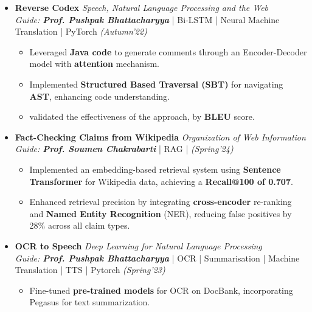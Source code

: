 \documentclass[a4paper,10.5pt]{article}
\begin{document}
\begin{itemize}[noitemsep,nolistsep]

\item \textbf{Reverse Codex} \hfill {\emph{Speech, Natural Language Processing and the Web}}\\
\emph{Guide: \textbf{Prof. Pushpak Bhattacharyya}} | Bi-LSTM | Neural Machine Translation | PyTorch\hfill
\emph{(Autumn'22)}
\vspace{0.1cm}
\begin{itemize}[noitemsep,nolistsep]
    \item Leveraged \textbf{Java code} to generate comments through an Encoder-Decoder model with \textbf{attention} mechanism.
    
    \item Implemented \textbf{Structured Based Traversal (SBT)} for navigating \textbf{AST}, enhancing code understanding.
    \vspace{0.07cm}
    
    \item validated the effectiveness of the approach, by \textbf{BLEU} score.
\end{itemize}
\vspace{0.15cm}

\item \textbf{Fact-Checking Claims from Wikipedia}  \hfill {\emph{Organization of Web Information}}\\
\emph{Guide: \textbf{Prof. Soumen Chakrabarti}} | RAG |  \hfill
\emph{(Spring'24)}
\vspace{0.1cm}
\begin{itemize}[noitemsep,nolistsep]
    \item Implemented an embedding-based retrieval system using \textbf{Sentence Transformer} for Wikipedia data, achieving a \textbf{Recall@100 of 0.707}.
    \vspace{0.07cm}
    \item Enhanced retrieval precision by integrating \textbf{cross-encoder} re-ranking and \textbf{Named Entity Recognition} (NER), reducing false positives by 28\% across all claim types.
\end{itemize}
\vspace{0.15cm}

\item \textbf{OCR to Speech} \hfill {\emph{Deep Learning for Natural Language Processing}}\\
\emph{Guide: \textbf{Prof. Pushpak Bhattacharyya}} | OCR | Summarisation | Machine Translation | TTS | Pytorch \hfill
\emph{(Spring'23)}
\begin{itemize}[noitemsep,nolistsep]
\vspace{0.1cm}
    \item Fine-tuned \textbf{pre-trained models} for OCR on DocBank, incorporating Pegasus for text summarization.
    \vspace{0.07cm}
    

\end{itemize}
\end{itemize}
\end{document}
